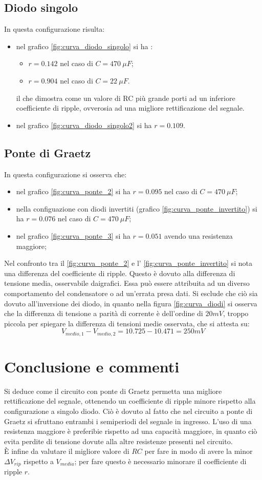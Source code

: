\documentclass[10pt,twocolumn]{article}
\begin{document}
\subsection{Diodo singolo}
In questa configurazione risulta: 
\begin{itemize}
    \item nel grafico \ref{fig:curva_diodo_singolo} si ha :
    \begin{itemize}
        \item $r=0.142$ nel caso di $C= 470 \: \mu F$;
        \item $r=0.904$ nel caso di $C= 22 \: \mu F$.
    \end{itemize}
    il che dimostra come un valore di RC più grande porti ad un inferiore coefficiente di ripple, ovverosia ad una migliore rettificazione del segnale.
    \item nel grafico \ref{fig:curva_diodo_singolo2} si ha $r=0.109$.
\end{itemize}
\subsection{Ponte di Graetz}
In questa configurazione si osserva che:
\begin{itemize}
    \item nel grafico \ref{fig:curva_ponte_2} si ha $r=0.095$ nel caso di $C= 470 \: \mu F$;
    \item nella configuazione con diodi invertiti (grafico \ref{fig:curva_ponte_invertito}) si ha $r=0.076$ nel caso di $C= 470 \: \mu F$;
    \item nel grafico \ref{fig:curva_ponte_3} si ha $r=0.051$ avendo una resistenza maggiore;
\end{itemize}
Nel confronto tra il \ref{fig:curva_ponte_2} e l' \ref{fig:curva_ponte_invertito} si nota una differenza del coefficiente di ripple.
Questo è dovuto alla differenza di tensione media, osservabile daigrafici. Essa può essere attribuita ad un diverso comportamento del condensatore o ad un'errata presa dati.
Si esclude che ciò sia dovuto all'inversione dei diodo, in quanto nella figura \ref{fig:curva_diodi} si osserva che la differenza di tensione a parità di corrente è dell'ordine di $ 20 mV$, troppo piccola per spiegare la differenza di tensioni medie osservata, che si attesta su:
\[V_{medio,1}- V_{medio,2}= 10.725-10.471 = 250 mV\]
\section{Conclusione e commenti}
Si deduce come il circuito con ponte di Graetz permetta una migliore rettificazione del segnale,
ottenendo un coefficiente di ripple minore rispetto alla configurazione a singolo diodo.
Ciò è dovuto al fatto che nel circuito a ponte di Graetz si sfruttano entrambi i semiperiodi del segnale in ingresso.
L'uso di una resistenza maggiore è preferibie rispetto ad una capacità maggiore, in quanto ciò evita perdite di tensione 
dovute alla altre resistenze presenti nel circuito.\\
È infine da valutare il migliore valore di $RC$ per fare in modo di avere la minor $\Delta V_{rip}$ rispetto a $V_{media}$; per fare questo è necessario minorare
il coefficiente di ripple $r$.
\end{document}
